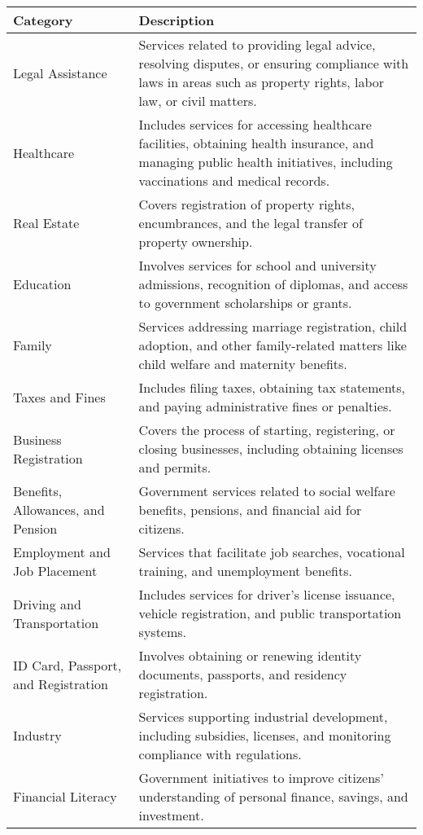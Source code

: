
\begin{table*}
\scriptsize
    \centering
    \begin{tabular}{p{}p{}}
    \toprule
\textbf{Category} & \textbf{Description} \\  
\midrule
Legal Assistance & Services related to providing legal advice, resolving disputes, or ensuring compliance with laws in areas such as property rights, labor law, or civil matters. \\  \midrule
Healthcare & Includes services for accessing healthcare facilities, obtaining health insurance, and managing public health initiatives, including vaccinations and medical records. \\  \midrule
Real Estate & Covers registration of property rights, encumbrances, and the legal transfer of property ownership. \\  \midrule
Education & Involves services for school and university admissions, recognition of diplomas, and access to government scholarships or grants. \\  \midrule
Family & Services addressing marriage registration, child adoption, and other family-related matters like child welfare and maternity benefits. \\  \midrule
Taxes and Fines & Includes filing taxes, obtaining tax statements, and paying administrative fines or penalties. \\  \midrule
Business Registration & Covers the process of starting, registering, or closing businesses, including obtaining licenses and permits. \\  \midrule
Benefits, Allowances, and Pension & Government services related to social welfare benefits, pensions, and financial aid for citizens. \\  \midrule
Employment and Job Placement & Services that facilitate job searches, vocational training, and unemployment benefits. \\  \midrule
Driving and Transportation & Includes services for driver’s license issuance, vehicle registration, and public transportation systems. \\  \midrule
ID Card, Passport, and Registration & Involves obtaining or renewing identity documents, passports, and residency registration. \\  \midrule
Industry & Services supporting industrial development, including subsidies, licenses, and monitoring compliance with regulations. \\  \midrule
Financial Literacy & Government initiatives to improve citizens' understanding of personal finance, savings, and investment. \\  \midrule

\end{tabular}
\end{table*}
